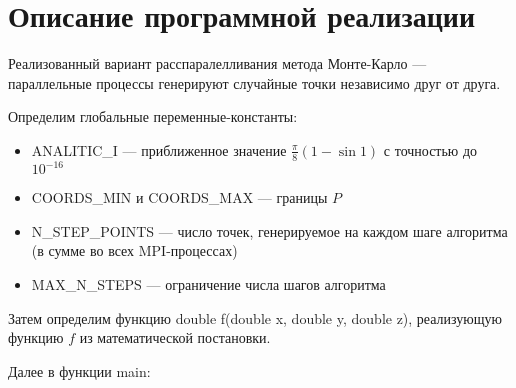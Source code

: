 \documentclass[oneside, final, 12pt]{extarticle}
\begin{document}
\section{Описание программной реализации}

Реализованный вариант расспаралелливания метода Монте-Карло --- параллельные процессы генерируют случайные точки независимо друг от друга.

Определим глобальные переменные-константы:
\begin{itemize}
    \item ANALITIC\_I --- приближенное значение $ \frac{\pi}{8} (1 - \sin 1) $ с точностью до $ 10^{-16} $
    \item COORDS\_MIN и COORDS\_MAX --- границы $ P $
    \item N\_STEP\_POINTS --- число точек, генерируемое на каждом шаге алгоритма (в сумме во всех MPI-процессах)
    \item MAX\_N\_STEPS --- ограничение числа шагов алгоритма
\end{itemize}

Затем определим функцию double f(double x, double y, double z), реализующую функцию $ f $ из математической постановки.

Далее в функции main:
\end{document}
